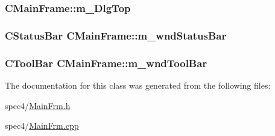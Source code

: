 \label{classCMainFrame_ae0e57c519c845b8d52e03f899253ff84}
\hypertarget{classCMainFrame_a0d47ffaae457eff994867478019bbc69}{
\subsubsection[{m\_\-DlgTop}]{ {\bf CMainFrame::m\_\-DlgTop}}}
\label{classCMainFrame_a0d47ffaae457eff994867478019bbc69}
\hypertarget{classCMainFrame_ac01bafc03aee69cf982e6f029b4db6b0}{
\subsubsection[{m\_\-wndStatusBar}]{\setlength{\rightskip}{0pt plus 5cm}CStatusBar {\bf CMainFrame::m\_\-wndStatusBar}}}
\label{classCMainFrame_ac01bafc03aee69cf982e6f029b4db6b0}
\hypertarget{classCMainFrame_a73024d794dce2fe918f6b117371c25fc}{
\subsubsection[{m\_\-wndToolBar}]{\setlength{\rightskip}{0pt plus 5cm}CToolBar {\bf CMainFrame::m\_\-wndToolBar}}}
\label{classCMainFrame_a73024d794dce2fe918f6b117371c25fc}


The documentation for this class was generated from the following files:\begin{DoxyCompactItemize}
\item 
spec4/\hyperlink{MainFrm_8h}{MainFrm.h}\item 
spec4/\hyperlink{MainFrm_8cpp}{MainFrm.cpp}\end{DoxyCompactItemize}
